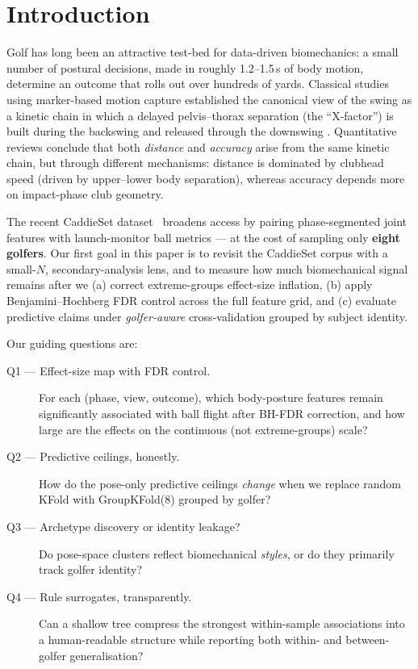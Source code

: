 \documentclass[11pt,a4paper]{article}
\begin{document}
\section{Introduction}

Golf has long been an attractive test-bed for data-driven biomechanics: a small number of postural decisions, made
in roughly 1.2--1.5\,s of body motion, determine an outcome that rolls out over hundreds of yards.  Classical
studies using marker-based motion capture established the canonical view of the swing as a kinetic chain in which
a delayed pelvis--thorax separation (the ``X-factor'') is built during the backswing and released through the
downswing \citep{cheetham2001xfactor,nesbit2005sixdof,meister2011rotational}.  Quantitative reviews
\citep{hume2005biomechanics} conclude that both \emph{distance} and \emph{accuracy} arise from the same kinetic
chain, but through different mechanisms: distance is dominated by clubhead speed (driven by upper--lower body
separation), whereas accuracy depends more on impact-phase club geometry.

The recent CaddieSet dataset~\citep{jung2025caddieset} broadens access by pairing phase-segmented joint features
with launch-monitor ball metrics --- at the cost of sampling only \textbf{eight golfers}.  Our first goal in this
paper is to revisit the CaddieSet corpus with a small-$N$, secondary-analysis lens, and to measure how much
biomechanical signal remains after we (a) correct extreme-groups effect-size inflation, (b) apply
Benjamini--Hochberg FDR control across the full feature grid, and (c) evaluate predictive claims under
\emph{golfer-aware} cross-validation grouped by subject identity.

Our guiding questions are:
\begin{description}
    \item[Q1 --- Effect-size map with FDR control.]
        For each (phase, view, outcome), which body-posture features remain significantly associated with
        ball flight after BH-FDR correction, and how large are the effects on the continuous (not extreme-groups)
        scale?
    \item[Q2 --- Predictive ceilings, honestly.]
        How do the pose-only predictive ceilings \emph{change} when we replace random KFold with GroupKFold(8)
        grouped by golfer?
    \item[Q3 --- Archetype discovery or identity leakage?]
        Do pose-space clusters reflect biomechanical \emph{styles}, or do they primarily track golfer identity?
    \item[Q4 --- Rule surrogates, transparently.]
        Can a shallow tree compress the strongest within-sample associations into a human-readable structure
        while reporting both within- and between-golfer generalisation?
\end{description}
\end{document}

